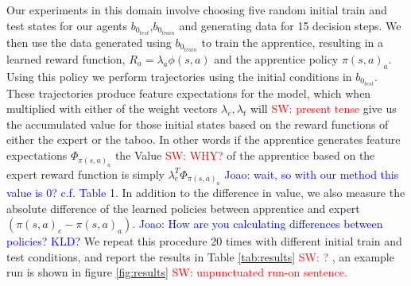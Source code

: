\documentclass[letterpaper]{article}
\newcommand{\sw}[1]{\textcolor{red}{SW: #1}}
\newcommand{\jm}[1]{\textcolor{blue}{Joao: #1}}
\newcommand{\sw}[1]{}
\newcommand{\jm}[1]{}
\begin{document}
Our experiments in this domain involve choosing five random initial train and test states for our agents $b_{0_{test}}$,$b_{0_{train}}$ and generating data for 15 decision steps. We then use the data generated using $b_{0_{train}}$ to train the apprentice, resulting in a learned reward function, $R_a = \lambda_a\phi(s,a)$ and the apprentice policy $\pi(s,a)_a$. Using this policy we perform trajectories using the initial conditions in $b_{0_{test}}$. These trajectories produce feature expectations for the model, which when multiplied with either of the weight vectors $\lambda_e,\lambda_t$ will \sw{present tense} give us the accumulated value for those initial states based on the reward functions of either the expert or the taboo. In other words if the apprentice generates feature expectations $\Phi_{\pi(s,a)_a}$ the Value \sw{WHY?} of the apprentice based on the expert reward function is simply $\lambda_e^T\Phi_{\pi(s,a)_a}$ \jm{wait, so with our method this value is $0$? c.f. Table 1}. In addition to the difference in value, we also measure the absolute difference of the learned policies between apprentice and expert $(\pi(s,a)_e - \pi(s,a)_a)$. 
\jm{How are you calculating differences between policies? KLD?} We repeat this procedure 20 times with different initial train and test conditions, and report the results in Table \ref{tab:results} \sw{?} , an example run is shown in figure \ref{fig:results} \sw{unpunctuated run-on sentence.}
\end{document}
